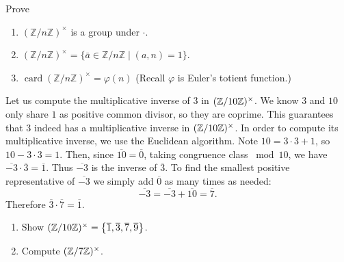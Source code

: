 \documentclass[11pt,a4paper]{article}
\begin{document}
\begin{eje} Prove 
    \begin{enumerate}[label=(\roman*)]
        \item \((\mathbb{Z} / n \mathbb{Z})^{\times}\) is a group under \(\cdot\).
        \item \((\mathbb{Z} / n \mathbb{Z})^{\times}=\{\bar{a} \in \mathbb{Z} / n \mathbb{Z} \mid(a, n)=1\}\).
        \item \(\operatorname{card}(\mathbb{Z} / n \mathbb{Z})^{\times} = \varphi(n)\) \hfill (Recall \(\varphi\) is Euler's totient function.)
    \end{enumerate}
\end{eje}

\begin{exa}
    Let us compute the multiplicative inverse of \(3\) in \((\mathbb{Z}/10 \mathbb{Z})^\times\).
    We know \(3\) and \(10\) only share \(1 \) as positive common divisor, so they are coprime.
    This guarantees that \(3\) indeed has  a multiplicative inverse in  \((\mathbb{Z}/10 \mathbb{Z})^\times\).
    In order to compute its multiplicative inverse, we use the Euclidean algorithm.
    Note \(10 = 3 \cdot 3 + 1\), so \(10 - 3 \cdot 3 = 1\). Then, since \(\overline{10} = \overline{0}\), taking congruence class \(\bmod 10\), we have \(\overline{-3}\cdot\overline{3} = \overline{1}\).
    Thus \(\overline{-3}\) is the inverse of \(\overline{3}\).
    To find the smallest positive representative of \(\overline{-3}\) we simply add \(\overline{0}\) as many times as needed:
    \[\overline{-3} = \overline{-3}+ \overline{10} = \overline{7}.\]
    Therefore \(\overline{3}\cdot\overline{7}=\overline{1}\).
\end{exa}

\begin{eje}
    \begin{enumerate}[label=(\roman*)]
        \item Show \((\mathbb{Z}/10 \mathbb{Z})^\times = \left\{ \overline{1}, \overline{3}, \overline{7}, \overline{9} \right\}\).
        \item Compute \((\mathbb{Z}/7 \mathbb{Z})^\times \).
    \end{enumerate}
    
\end{eje}
\end{document}
